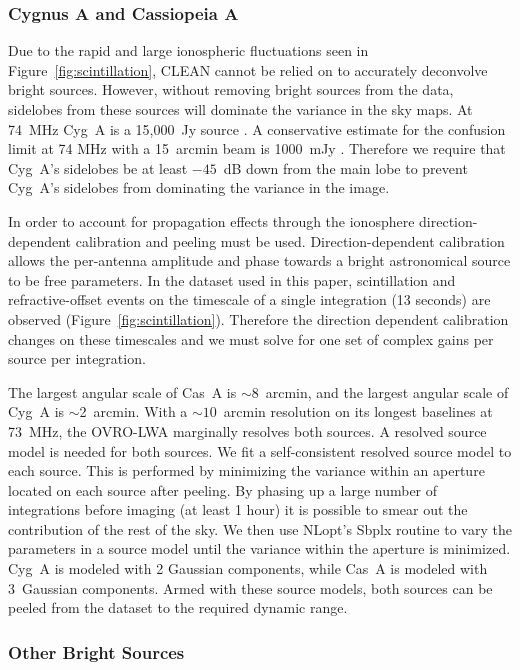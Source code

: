 \documentclass[twocolumn]{aastex61}
\begin{document}
\subsubsection{Cygnus A and Cassiopeia A}

Due to the rapid and large ionospheric fluctuations seen in Figure~\ref{fig:scintillation}, CLEAN
cannot be relied on to accurately deconvolve bright sources.  However, without removing bright
sources from the data, sidelobes from these sources will dominate the variance in the sky maps.  At
74~MHz Cyg~A is a 15,000~Jy source \citep{1977A&A....61...99B}. A conservative estimate for the
confusion limit at 74 MHz with a 15~arcmin beam is 1000~mJy \citep{2014MNRAS.440..327L}. Therefore
we require that Cyg~A's sidelobes be at least $-45$~dB down from the main lobe to prevent Cyg~A's
sidelobes from dominating the variance in the image.

In order to account for propagation effects through the ionosphere direction-dependent calibration
and peeling \citep{2008ISTSP...2..707M, 2015MNRAS.449.2668S} must be used.  Direction-dependent
calibration allows the per-antenna amplitude and phase towards a bright astronomical source to be
free parameters. In the dataset used in this paper, scintillation and refractive-offset events on
the timescale of a single integration (13 seconds) are observed (Figure~\ref{fig:scintillation}).
Therefore the direction dependent calibration changes on these timescales and we must solve for one
set of complex gains per source per integration.

The largest angular scale of Cas~A is $\sim$8~arcmin, and the largest angular scale of Cyg~A is
$\sim$2~arcmin. With a $\sim10$~arcmin resolution on its longest baselines at 73~MHz, the OVRO-LWA
marginally resolves both sources. A resolved source model is needed for both sources. We fit a
self-consistent resolved source model to each source. This is performed by minimizing the variance
within an aperture located on each source after peeling. By phasing up a large number of
integrations before imaging (at least 1 hour) it is possible to smear out the contribution of the
rest of the sky.  We then use NLopt's Sbplx routine \citep{nlopt, sbplx} to vary the parameters in a
source model until the variance within the aperture is minimized. Cyg~A is modeled with 2 Gaussian
components, while Cas~A is modeled with 3~Gaussian components. Armed with these  source models, both
sources can be peeled from the dataset to the required dynamic range.

\subsubsection{Other Bright Sources}
\end{document}
